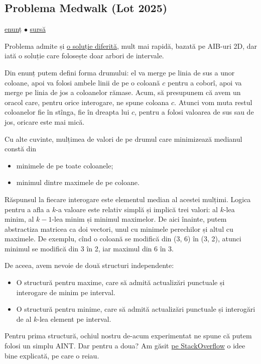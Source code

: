 \subsection{Problema Medwalk (Lot 2025)}
\label{problem:medwalk}

\href{https://kilonova.ro/problems/3790}{enunț}
$\bullet$
\hyperref[code:medwalk]{sursă}

Problema admite și \href{https://kilonova.ro/submissions/770475}{o soluție diferită}, mult mai rapidă, bazată pe AIB-uri 2D, dar iată o soluție care folosește doar arbori de intervale.

Din enunț putem defini forma drumului: el va merge pe linia de sus a unor coloane, apoi va folosi ambele linii de pe o coloană $c$ pentru a coborî, apoi va merge pe linia de jos a coloanelor rămase. Acum, să presupunem că avem un oracol care, pentru orice interogare, ne spune coloana $c$. Atunci vom muta restul coloanelor fie în stînga, fie în dreapta lui $c$, pentru a folosi valoarea de sus sau de jos, oricare este mai mică.

Cu alte cuvinte, mulțimea de valori de pe drumul care minimizează medianul constă din

\begin{itemize}
  \item minimele de pe toate coloanele;
  \item minimul dintre maximele de pe coloane.
\end{itemize}

Răspunsul la fiecare interogare este elementul median al acestei mulțimi. Logica pentru a afla a $k$-a valoare este relativ simplă și implică trei valori: al $k$-lea minim, al $k-1$-lea minim și minimul maximelor. De aici înainte, putem abstractiza matricea ca doi vectori, unul cu minimele perechilor și altul cu maximele. De exemplu, cînd o coloană se modifică din (3, 6) în (3, 2), atunci minimul se modifică din 3 în 2, iar maximul din 6 în 3.

De aceea, avem nevoie de două structuri independente:

\begin{itemize}
  \item O structură pentru maxime, care să admită actualizări punctuale și interogare de minim pe interval.
  \item O structură pentru minime, care să admită actualizări punctuale și interogări de al $k$-lea element pe interval.
\end{itemize}

Pentru prima structură, ochiul nostru de-acum experimentat ne spune că putem folosi un simplu AINT. Dar pentru a doua? Am găsit \href{https://stackoverflow.com/a/22075025/6022817}{pe StackOverflow} o idee bine explicată, pe care o reiau.

